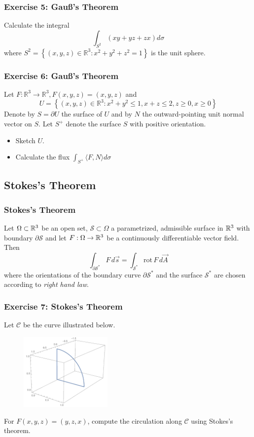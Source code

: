 \documentclass[11pt, t]{beamer}
\renewcommand{\emph}[1]{{\color{Turquoise3}\textsl{#1}}}
\begin{document}
\begin{frame}
    \frametitle{Exercise 5: Gau\ss's Theorem}
    Calculate the integral
    \[
        \int_{S^{2}}(x y+y z+z x) d \sigma
    \]
    where $S^{2}=\left\{(x, y, z) \in \mathbb{R}^{3}: x^{2}+y^{2}+z^{2}=1\right\}$ is the unit sphere.
\end{frame}

\begin{frame}
    \frametitle{Exercise 6: Gau\ss's Theorem}
    Let $F: \mathbb{R}^{3} \rightarrow \mathbb{R}^{3}, F(x, y, z)=(x, y, z)$ and
    \[
        U=\left\{(x, y, z) \in \mathbb{R}^{3}: x^{2}+y^{2} \leq 1, x+z \leq 2, z \geq 0, x \geq 0\right\}
    \]
    Denote by $S=\partial U$ the surface of $U$ and by $N$ the outward-pointing unit normal vector on $S .$ Let $S^{+}$ denote the surface $S$ with positive orientation.
    \begin{itemize}
        \item Sketch $U$.
        \item Calculate the flux $\int_{S^{+}}\langle F, N\rangle d \sigma$
    \end{itemize}
\end{frame}




\subsection{Stokes's Theorem}
\begin{frame}
    \frametitle{Stokes's Theorem}
    Let $\Omega\subset\mathbb{R}^3$ be an open set, $\mathcal{S}\subset\Omega$ a parametrized, admissible surface in $\mathbb{R}^3$ with boundary $\partial\mathcal{S}$ and let $F:\Omega\to\mathbb{R}^3$ be a continuously dif{}ferentiable vector field. Then
    \[\int_{\partial\mathcal{S}^*}F\,d\vec{s}=
        \int_{\mathcal{S}^*}\text{rot}\,F\,d\vec{A}\]
    where the orientations of the boundary curve $\partial\mathcal{S}^*$ and the surface $\mathcal{S}^*$ are chosen according to \emph{right hand law}.
\end{frame}

\begin{frame}
    \frametitle{Exercise 7: Stokes's Theorem}
    Let $\mathcal{C}$ be the curve illustrated below.
    \begin{figure}[H]
        \centering
        \includegraphics[width=0.4\textwidth]{Figures/p2.pdf}
    \end{figure}
    For $F(x,y,z)=(y,z,x)$, compute the circulation along $\mathcal{C}$ using Stokes's theorem.
\end{frame}
\end{document}
